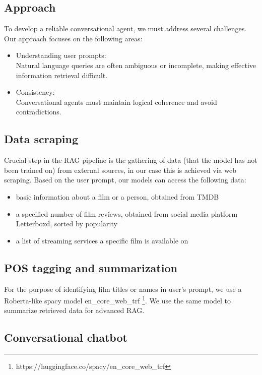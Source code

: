 \documentclass[fleqn,moreauthors,10pt]{ds_report}
\begin{document}
\subsection*{Approach}
To develop a reliable conversational agent, we must address several challenges.
Our approach focuses on the following areas:
\begin{itemize}
\item Understanding user prompts:\\
Natural language queries are often ambiguous or incomplete, making effective information retrieval difficult.
\item Consistency:\\
Conversational agents must maintain logical coherence and avoid contradictions.


\end{itemize}


\subsection*{Data scraping}

Crucial step in the RAG pipeline is the gathering of data (that the model has not been trained on) from external sources, in our case this is achieved via web scraping. Based on the user prompt, our models can access the following data:
\begin{itemize}
	\item basic information about a film or a person, obtained from TMDB
	\item a specified number of film reviews, obtained from social media platform Letterboxd, sorted by popularity
	\item a list of streaming services a specific film is available on
\end{itemize}

\subsection*{POS tagging and summarization}

For the purpose of identifying film titles or names in user's prompt, we use a Roberta-like spacy model en\_core\_web\_trf \footnote{https://huggingface.co/spacy/en\_core\_web\_trf}. We use the same model to summarize retrieved data for advanced RAG.  


\subsection*{Conversational chatbot}
\end{document}
